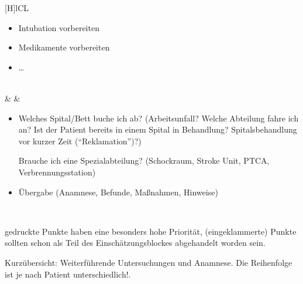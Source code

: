 {\begin{minipage}{\linewidth}
{\begin{tabulary}{\linewidth}[H]{lCL}
\begin{minipage}{\linewidth}
\begin{itemize}
  \item Intubation vorbereiten
  \item Medikamente vorbereiten
  \item \ldots
\end{itemize}
\end{minipage}
\\\addlinespace\midrule\addlinespace
{}
&
&
\begin{minipage}{\linewidth}
\begin{itemize}
  \item Welches Spital/Bett buche ich ab? {\tiny(Arbeitsunfall?
  Welche Abteilung fahre ich an? Ist der Patient bereits in
  einem Spital in Behandlung? Spitalsbehandlung vor kurzer
  Zeit (\enquote{Reklamation})?)}
  
  Brauche ich eine Spezialabteilung? {\tiny(Schockraum, Stroke
  Unit, PTCA, Verbrennungsstation)}
  \item Übergabe {\tiny(Anamnese, Befunde, Maßnahmen, Hinweise)}
\end{itemize}
\end{minipage}

\\\addlinespace\bottomrule
\end{tabulary}}

{\scriptsize{} gedruckte Punkte haben eine besonders hohe Priorität, (eingeklammerte) Punkte sollten schon als Teil des Einschätzungsblockes abgehandelt worden sein.}
\end{minipage}
}
{Kurzübersicht: Weiterführende Untersuchungen und Anamnese.
Die Reihenfolge ist je nach Patient
unterschiedlich!\label{tab:checkliste-patientenmanagement}\label{tab:pam-weiterfuehrende}.}
{}





